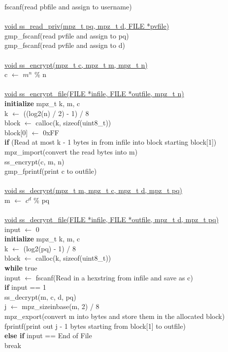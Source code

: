 \documentclass[12pt]{article}
\begin{document}
\indent fscanf(read pbfile and assign to username) \\
\\
\underline{void ss\_read\_priv(mpz\_t pq, mpz\_t d, FILE *pvfile)} \\
\indent gmp\_fscanf(read pvfile and assign to pq) \\
\indent gmp\_fscanf(read pvfile and assign to d) \\
\\
\underline{void ss\_encrypt(mpz\_t c, mpz\_t m, mpz\_t n)} \\
\indent c $\leftarrow$ $m^n$ \% n\\
\\
\underline{void ss\_encrypt\_file(FILE *infile, FILE *outfile, mpz\_t n)} \\
\indent \textbf{initialize} mpz\_t k, m, c \\
\indent k $\leftarrow$ ((log2(n) / 2) - 1) / 8 \\
\indent *block $\leftarrow$ calloc(k, sizeof(uint8\_t)) \\
\indent block[0] $\leftarrow$ 0xFF \\
\indent \textbf{if} (Read at most k - 1 bytes in from infile into block starting block[1]) \\
\indent \indent mpz\_import(convert the read bytes into m) \\
\indent \indent ss\_encrypt(c, m, n) \\
\indent \indent gmp\_fprintf(print c to outfile) \\
\\
\underline{void ss\_decrypt(mpz\_t m, mpz\_t c, mpz\_t d, mpz\_t pq)} \\
\indent m $\leftarrow$ $c^d$ \% pq\\
\\
\underline{void ss\_decrypt\_file(FILE *infile, FILE *outfile, mpz\_t d, mpz\_t pq)} \\
\indent input $\leftarrow$ 0 \\
\indent \textbf{initialize} mpz\_t k, m, c \\
\indent k $\leftarrow$ (log2(pq) - 1) / 8 \\
\indent *block $\leftarrow$ calloc(k, sizeof(uint8\_t)) \\
\indent \textbf{while} true \\
\indent \indent input $\leftarrow$ fscanf(Read in a hexstring from infile and save as c) \\
\indent \indent \textbf{if} input == 1 \\
\indent \indent \indent ss\_decrypt(m, c, d, pq) \\
\indent\indent \indent j $\leftarrow$ mpz\_sizeinbase(m, 2) / 8 \\
\indent \indent \indent mpz\_export(convert m into bytes and store them in the allocated block) \\
\indent \indent \indent fprintf(print out j - 1 bytes starting from block[1] to outfile) \\
\indent \indent \textbf{else if} input == End of File \\
\indent \indent \indent break \\
\\
\end{document}
